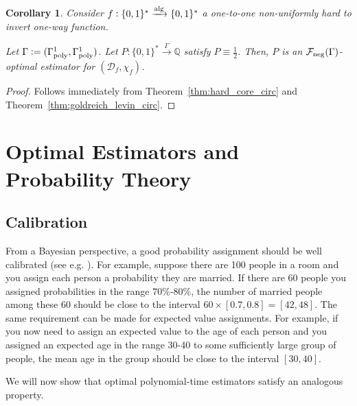 \documentclass[11pt]{article}
\numberwithin{equation}{section}
\theoremstyle{definition}
\theoremstyle{plain}
\newtheorem{corollary}{Corollary}[section]
\newcommand{\Bool}{\{0,1\}}
\newcommand{\Words}{{\Bool^*}}
\newcommand{\Rats}{\mathbb{Q}}
\newcommand{\Dist}{\mathcal{D}}
\newcommand{\Fall}{\mathcal{F}}
\newcommand{\GammaPoly}{\Gamma_{\textnormal{poly}}}
\newcommand{\Alg}{\xrightarrow{\textnormal{alg}}}
\newcommand{\Scheme}{\xrightarrow{\Gamma}}
\begin{document}
\begin{corollary}

Consider $f: \Words \Alg \Words$ a one-to-one non-uniformly hard to invert one-way function.

Let $\Gamma:=(\GammaPoly^1,\GammaPoly^1)$. Let $P: \Words \Scheme \Rats$ satisfy $P \equiv \frac{1}{2}$. Then, $P$ is an $\Fall_{\textnormal{neg}}(\Gamma)$-optimal estimator for $(\Dist_f, \chi_f)$.

\end{corollary}

\begin{proof}

Follows immediately from Theorem~\ref{thm:hard_core_circ} and Theorem~\ref{thm:goldreich_levin_circ}.
\end{proof}

\section{Optimal Estimators and Probability Theory}
\label{sec:probability}

\subsection{Calibration}

From a Bayesian perspective, a good probability assignment should be well calibrated (see e.g. \cite{Dawid_1982}). For example, suppose there are 100 people in a room and you assign each person a probability they are married. If there are 60 people you assigned probabilities in the range 70\%-80\%, the number of married people among these 60 should be close to the interval $60 \times [0.7, 0.8] = [42,48]$. The same requirement can be made for expected value assignments. For example, if you now need to assign an expected value to the age of each person and you assigned an expected age in the range 30-40 to some sufficiently large group of people, the mean age in the group should be close to the interval $[30,40]$. 

We will now show that optimal polynomial-time estimators satisfy an analogous property.
\end{document}
